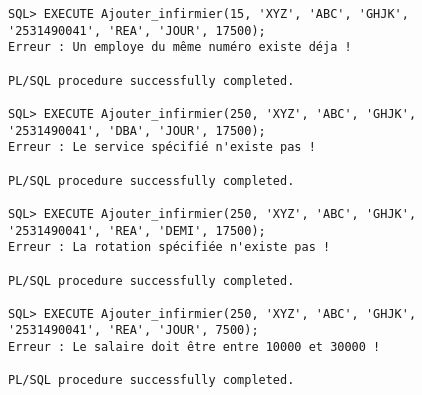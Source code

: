 \documentclass[12pt,a4paper]{article}
\begin{document}
\begin{enumerate}
\begin{snugshade}
\begin{verbatim}
SQL> EXECUTE Ajouter_infirmier(15, 'XYZ', 'ABC', 'GHJK',
'2531490041', 'REA', 'JOUR', 17500);
Erreur : Un employe du même numéro existe déja !

PL/SQL procedure successfully completed.

SQL> EXECUTE Ajouter_infirmier(250, 'XYZ', 'ABC', 'GHJK',
'2531490041', 'DBA', 'JOUR', 17500);
Erreur : Le service spécifié n'existe pas !

PL/SQL procedure successfully completed.

SQL> EXECUTE Ajouter_infirmier(250, 'XYZ', 'ABC', 'GHJK',
'2531490041', 'REA', 'DEMI', 17500);
Erreur : La rotation spécifiée n'existe pas !

PL/SQL procedure successfully completed.

SQL> EXECUTE Ajouter_infirmier(250, 'XYZ', 'ABC', 'GHJK',
'2531490041', 'REA', 'JOUR', 7500);
Erreur : Le salaire doit être entre 10000 et 30000 !

PL/SQL procedure successfully completed.
        \end{verbatim}
    \end{snugshade}
    \end{enumerate}
\end{document}
